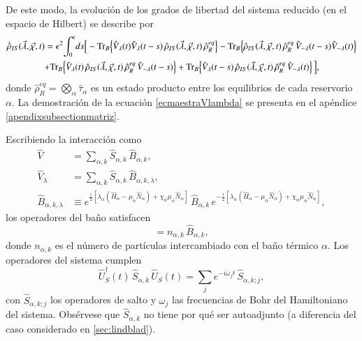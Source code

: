 De este modo, la evolución de los grados de libertad del sistema reducido (en el espacio de Hilbert) se describe por
\begin{multline}
    \dot{\hat{\rho}}_{IS}(\vec{\lambda},\vec{\chi},t) 
    = \epsilon^{2}\!\int_{0}^{t}\!ds \Big[
      - \textnormal{Tr}_{B}\!\left\{\hat{V}_{\lambda}(t)\hat{V}_{\lambda}(t-s)\,\hat{\rho}_{IS}(\vec{\lambda},\vec{\chi},t)\,\hat{\rho}^{eq}_{R}\right\}
      - \textnormal{Tr}_{B}\!\left\{\hat{\rho}_{IS}(\vec{\lambda},\vec{\chi},t)\,\hat{\rho}^{eq}_{R}\,\hat{V}_{-\lambda}(t-s)\hat{V}_{-\lambda}(t)\right\} \\
      + \textnormal{Tr}_{B}\!\left\{\hat{V}_{\lambda}(t)\,\hat{\rho}_{IS}(\vec{\lambda},\vec{\chi},t)\,\hat{\rho}^{eq}_{R}\,\hat{V}_{-\lambda}(t-s)\right\}
      + \textnormal{Tr}_{B}\!\left\{\hat{V}_{\lambda}(t-s)\,\hat{\rho}_{IS}(\vec{\lambda},\vec{\chi},t)\,\hat{\rho}^{eq}_{R}\,\hat{V}_{-\lambda}(t)\right\}
    \Big],
    \label{ecmaestraVlambda}
\end{multline}
donde \(\hat{\rho}^{eq}_{R}=\bigotimes_{\alpha}\hat{\tau}_{\alpha}\) es un estado producto entre los equilibrios de cada reservorio $\alpha$. La demostración de la ecuación \eqref{ecmaestraVlambda} se presenta en el apéndice \ref{apendixsubsectionmatriz}.

Escribiendo la interacción como
\begin{align*}
    \hat{V} &= \sum_{\alpha,k}\hat{S}_{\alpha,k}\,\hat{B}_{\alpha,k}, \\
    \hat{V}_{\lambda} &= \sum_{\alpha,k}\hat{S}_{\alpha,k}\,\hat{B}_{\alpha,k,\lambda}, \\
    \hat{B}_{\alpha,k,\lambda} 
      &\equiv e^{\frac{i}{2}[\lambda_{\alpha}(\hat{H}_{\alpha} - \mu_{\alpha}\hat{N}_{\alpha}) + \chi_{\alpha}\mu_{\alpha}\hat{N}_{\alpha}]}\,
               \hat{B}_{\alpha,k}\,
               e^{-\frac{i}{2}[\lambda_{\alpha}(\hat{H}_{\alpha} - \mu_{\alpha}\hat{N}_{\alpha}) + \chi_{\alpha}\mu_{\alpha}\hat{N}_{\alpha}]},
\end{align*}
los operadores del baño satisfacen
\begin{equation*}
    [\hat{B}_{\alpha,k},\hat{N}_{\alpha}] = n_{\alpha,k}\,\hat{B}_{\alpha,k},
\end{equation*}
donde \(n_{\alpha,k}\) es el número de partículas intercambiado con el baño térmico \(\alpha\). Los operadores del sistema cumplen
\begin{equation*}
    \hat{U}^{\dagger}_{S}(t)\,\hat{S}_{\alpha,k}\,\hat{U}_{S}(t) 
    = \sum_{j} e^{-i\omega_{j}t}\,\hat{S}_{\alpha,k;j},
\end{equation*}
con \(\hat{S}_{\alpha,k;j}\) los operadores de salto y \(\omega_{j}\) las frecuencias de Bohr del Hamiltoniano del sistema. Obsérvese que \(\hat{S}_{\alpha,k}\) no tiene por qué ser autoadjunto (a diferencia del caso considerado en \ref{sec:lindblad}).

